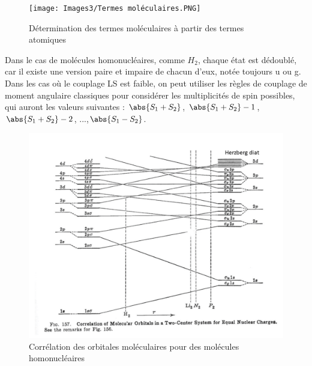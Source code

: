 \begin{figure}[tpb]
    \centering
    \texttt{[image: Images3/Termes moléculaires.PNG]}
    \caption{Détermination des termes moléculaires à partir des termes atomiques}
    \label{fig:termes mol}
\end{figure}
Dans le cas de molécules homonucléaires, comme $H_2$, chaque état est dédoublé, car il existe une version paire et impaire de chacun d'eux, notée toujours u ou g.\newline
Dans les cas où le couplage LS est faible, on peut utiliser les règles de couplage de moment angulaire
classiques pour considérer les multiplicités de spin possibles, qui auront les valeurs suivantes : $\abs{S_1+S_2}$, $\abs{S_1+S_2}-1$, $\abs{S_1+S_2}-2$, ...,$\abs{S_1-S_2}$.
\begin{figure}
    \centering
    \includegraphics[scale=0.65]{Images3/Corrélation homonucléaire.png}
    \caption{Corrélation des orbitales moléculaires pour des molécules homonucléaires}
\end{figure}
